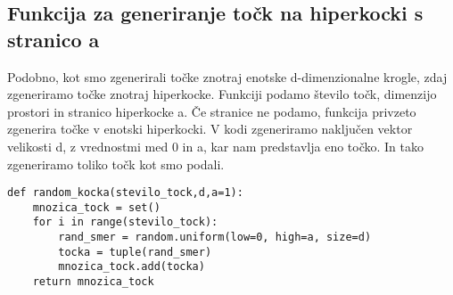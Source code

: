 \documentclass{article}
\begin{document}
\subsection{Funkcija za generiranje točk na hiperkocki s stranico a}
Podobno, kot smo zgenerirali točke znotraj enotske d-dimenzionalne krogle, zdaj zgeneriramo točke znotraj hiperkocke. Funkciji podamo število točk, dimenzijo prostori in stranico hiperkocke a. Če stranice ne podamo, funkcija privzeto zgenerira točke v enotski hiperkocki. V kodi zgeneriramo naključen vektor velikosti d, z vrednostmi med 0 in a, kar nam predstavlja eno točko. In tako zgeneriramo toliko točk kot smo podali.
\begin{verbatim}
def random_kocka(stevilo_tock,d,a=1): 
    mnozica_tock = set()
    for i in range(stevilo_tock):
        rand_smer = random.uniform(low=0, high=a, size=d)
        tocka = tuple(rand_smer)
        mnozica_tock.add(tocka)
    return mnozica_tock
\end{verbatim}





\
\end{document}
